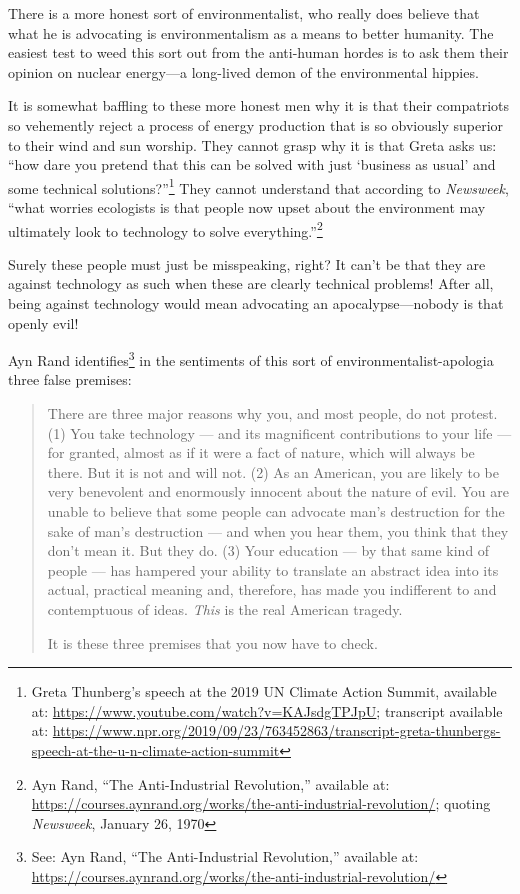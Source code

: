 \documentclass[11pt]{article}
\begin{document}
There is a more honest sort of environmentalist, who really does believe that what he is advocating is environmentalism as a means to better humanity. The easiest test to weed this sort out from the anti-human hordes is to ask them their opinion on nuclear energy---a long-lived demon of the environmental hippies.

It is somewhat baffling to these more honest men why it is that their compatriots so vehemently reject a process of energy production that is so obviously superior to their wind and sun worship. They cannot grasp why it is that Greta asks us: ``how dare you pretend that this can be solved with just `business as usual' and some technical solutions?''\footnote{Greta Thunberg's speech at the 2019 UN Climate Action Summit, available at: \url{https://www.youtube.com/watch?v=KAJsdgTPJpU}; transcript available at: \url{https://www.npr.org/2019/09/23/763452863/transcript-greta-thunbergs-speech-at-the-u-n-climate-action-summit}} They cannot understand that according to \emph{Newsweek}, ``what worries ecologists is that people now upset about the environment may ultimately look to technology to solve everything.''\footnote{Ayn Rand, ``The Anti-Industrial Revolution,'' available at: \url{https://courses.aynrand.org/works/the-anti-industrial-revolution/}; quoting \emph{Newsweek}, January 26, 1970}

Surely these people must just be misspeaking, right? It can't be that they are against technology as such when these are clearly technical problems! After all, being against technology would mean advocating an apocalypse---nobody is that openly evil!

Ayn Rand identifies\footnote{See: Ayn Rand, ``The Anti-Industrial Revolution,'' available at: \url{https://courses.aynrand.org/works/the-anti-industrial-revolution/}} in the sentiments of this sort of environmentalist-apologia three false premises:
\begin{quote}
There are three major reasons why you, and most people, do not protest. (1) You take technology --- and its magnificent contributions to your life --- for granted, almost as if it were a fact of nature, which will always be there. But it is not and will not. (2) As an American, you are likely to be very benevolent and enormously innocent about the nature of evil. You are unable to believe that some people can advocate man's destruction for the sake of man's destruction --- and when you hear them, you think that they don’t mean it. But they do. (3) Your education --- by that same kind of people --- has hampered your ability to translate an abstract idea into its actual, practical meaning and, therefore, has made you indifferent to and contemptuous of ideas. \emph{This} is the real American tragedy.

It is these three premises that you now have to check.
\end{quote}
\end{document}
